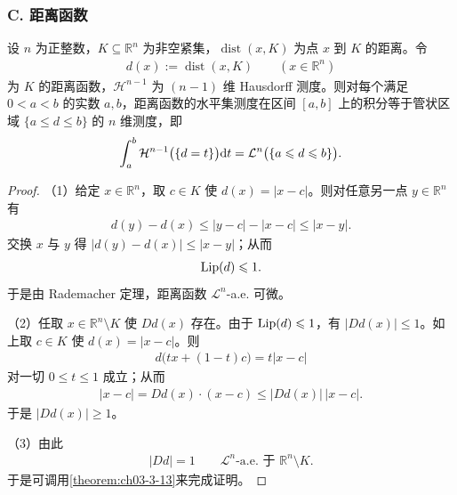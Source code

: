 \documentclass[../../main.tex]{subfiles}%
\begin{document}
\subsubsection*{C. 距离函数}

\begin{theorem}[距离函数的水平集]\label{theorem:ch03-3-14}
设 $n$ 为正整数，$K\subseteq\mathbb{R}^n$ 为非空紧集，$\operatorname{dist}(x,K)$ 为点 $x$ 到 $K$ 的距离。令
\begin{align*}
d(x):=\operatorname{dist}(x,K)\qquad(x\in\mathbb{R}^n)
\end{align*}
为 $K$ 的距离函数，$\mathcal{H}^{n-1}$ 为 $(n-1)$ 维 Hausdorff 测度。则对每个满足 $0<a<b$ 的实数 $a,b$，距离函数的水平集测度在区间 $[a,b]$ 上的积分等于管状区域 $\{a\leqslant d\leqslant b\}$ 的 $n$ 维测度，即
\begin{align*}
\int_a^b\mathcal{H}^{n-1}\bigl(\{d=t\}\bigr)\mathrm{d} t=\mathcal{L}^n\bigl(\{a\leqslant d\leqslant b\}\bigr).
\end{align*}
\end{theorem}

\begin{proof}
（1）给定 $x\in\mathbb{R}^n$，取 $c\in K$ 使 $d(x)=\lvert x-c\rvert$。则对任意另一点 $y\in\mathbb{R}^n$ 有
\begin{align*}
d(y)-d(x)\leqslant\lvert y-c\rvert-\lvert x-c\rvert\leqslant\lvert x-y\rvert.
\end{align*}
交换 $x$ 与 $y$ 得 $\lvert d(y)-d(x)\rvert\leqslant\lvert x-y\rvert$；从而
\begin{align*}
\operatorname{Lip}(d)\leqslant1.
\end{align*}
于是由 Rademacher 定理，距离函数 $\mathcal{L}^n$-a.e. 可微。

（2）任取 $x\in\mathbb{R}^n\setminus K$ 使 $Dd(x)$ 存在。由于 $\operatorname{Lip}(d)\leqslant1$，有 $\lvert Dd(x)\rvert\leqslant1$。如上取 $c\in K$ 使 $d(x)=\lvert x-c\rvert$。则
\begin{align*}
d\bigl(tx+(1-t)c\bigr)=t\lvert x-c\rvert
\end{align*}
对一切 $0\leqslant t\leqslant1$ 成立；从而
\begin{align*}
\lvert x-c\rvert=Dd(x)\cdot(x-c)\leqslant\lvert Dd(x)\rvert\,\lvert x-c\rvert.
\end{align*}
于是 $\lvert Dd(x)\rvert\geqslant1$。

（3）由此
\begin{align*}
\lvert Dd\rvert=1\qquad\mathcal{L}^n\text{-a.e. 于 }\mathbb{R}^n\setminus K.
\end{align*}
于是可调用\cref{theorem:ch03-3-13}来完成证明。%
\end{proof}
\end{document}
